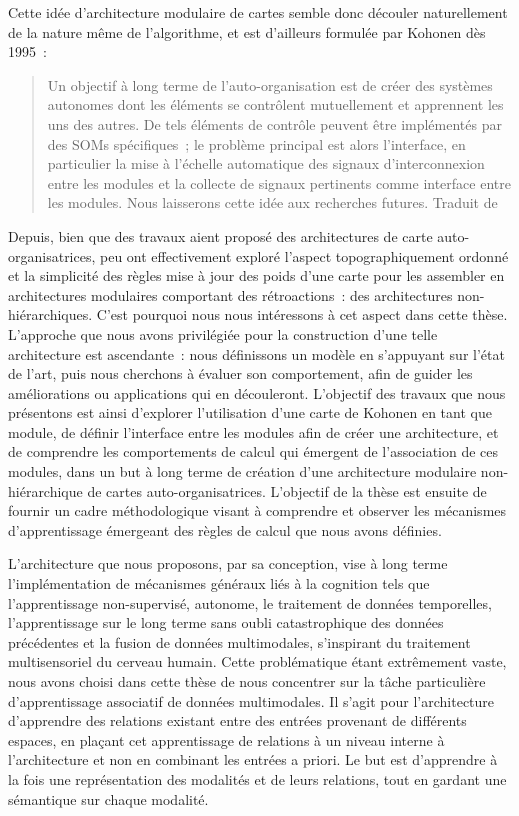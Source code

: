 Cette idée d'architecture modulaire de cartes semble donc découler naturellement de la nature même de l'algorithme, et est d'ailleurs formulée par Kohonen dès 1995~:
\begin{quote}
Un objectif à long terme de l'auto-organisation est de créer des systèmes autonomes dont les éléments se contrôlent mutuellement et apprennent les uns des autres. De tels éléments de contrôle peuvent être implémentés par des SOMs spécifiques~; le problème principal est alors l'interface, en particulier la mise à l'échelle automatique des signaux d'interconnexion entre les modules et la collecte de signaux pertinents comme interface entre les modules. Nous laisserons cette idée aux recherches futures.
Traduit de \cite{Kohonen1995SelfOrganizingM}
\end{quote}

Depuis, bien que des travaux aient proposé des architectures de carte auto-organisatrices, peu ont effectivement exploré l'aspect topographiquement ordonné et la simplicité des règles mise à jour des poids d'une carte pour les assembler en architectures modulaires comportant des rétroactions~: des architectures non-hiérarchiques. C'est pourquoi nous nous intéressons à cet aspect dans cette thèse.
L'approche que nous avons privilégiée pour la construction d'une telle architecture est ascendante~: nous définissons un modèle en s'appuyant sur l'état de l'art, puis nous cherchons à évaluer son comportement, afin de guider les améliorations ou applications qui en découleront.
L'objectif des travaux que nous présentons est ainsi d'explorer l'utilisation d'une carte de Kohonen en tant que module, de définir l'interface entre les modules afin de créer une architecture, et de comprendre les comportements de calcul qui émergent de l'association de ces modules, dans un but à long terme de création d'une architecture modulaire non-hiérarchique de cartes auto-organisatrices.
L'objectif de la thèse est ensuite de fournir un cadre méthodologique visant à comprendre et observer les mécanismes d'apprentissage émergeant des règles de calcul que nous avons définies.

L'architecture que nous proposons, par sa conception, vise à long terme l'implémentation de mécanismes généraux liés à la cognition tels que l'apprentissage non-supervisé, autonome, le traitement de données temporelles, l'apprentissage sur le long terme sans oubli catastrophique des données précédentes et la fusion de données multimodales, s'inspirant du traitement multisensoriel du cerveau humain.
Cette problématique étant extrêmement vaste, nous avons choisi dans cette thèse de nous concentrer sur la tâche particulière d'apprentissage associatif de données multimodales. 
Il s'agit pour l'architecture d'apprendre des relations existant entre des entrées provenant de différents espaces, en plaçant cet apprentissage de relations à un niveau interne à l'architecture et non en combinant les entrées a priori. Le but est d'apprendre à la fois une représentation des modalités et de leurs relations, tout en gardant une sémantique sur chaque modalité.

